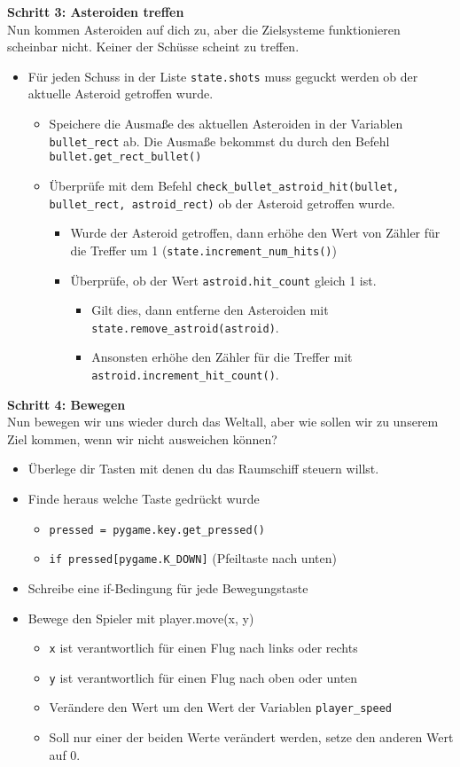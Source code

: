 \textbf{Schritt 3: Asteroiden treffen}\\
Nun kommen Asteroiden auf dich zu, aber die Zielsysteme funktionieren scheinbar nicht. Keiner der Schüsse scheint zu treffen.
\begin{itemize}
	\item Für jeden Schuss in der Liste \texttt{state.shots} muss geguckt werden ob der aktuelle Asteroid getroffen wurde.
	\begin{itemize}
		\item Speichere die Ausmaße des aktuellen Asteroiden in der Variablen \texttt{bullet\_rect} ab. Die Ausmaße bekommst du durch den Befehl \texttt{bullet.get\_rect\_bullet()}
		\item Überprüfe mit dem Befehl \texttt{check\_bullet\_astroid\_hit(bullet, bullet\_rect, astroid\_rect)} ob der Asteroid getroffen wurde.
		\begin{itemize}
			\item Wurde der Asteroid getroffen, dann erhöhe den Wert von Zähler für die Treffer um 1 (\texttt{state.increment\_num\_hits()})
			\item Überprüfe, ob der Wert \texttt{astroid.hit\_count} gleich 1 ist.
			\begin{itemize}
				\item Gilt dies, dann entferne den Asteroiden mit \texttt{state.remove\_astroid(astroid)}.
				\item Ansonsten erhöhe den Zähler für die Treffer mit \texttt{astroid.increment\_hit\_count()}.
			\end{itemize}
		\end{itemize}
	\end{itemize}
\end{itemize}
\textbf{Schritt 4: Bewegen}\\
Nun bewegen wir uns wieder durch das Weltall, aber wie sollen wir zu unserem Ziel kommen, wenn wir nicht ausweichen können?
\begin{itemize}
	\item Überlege dir Tasten mit denen du das Raumschiff steuern willst.
	\item Finde heraus welche Taste gedrückt wurde
	\begin{itemize}
		\item \texttt{pressed = pygame.key.get\_pressed()}
		\item \texttt{if pressed[pygame.K\_DOWN]} (Pfeiltaste nach unten)
	\end{itemize}
	\item Schreibe eine if-Bedingung für jede Bewegungstaste
	\item Bewege den Spieler mit player.move(x, y)
	\begin{itemize}
		\item \texttt{x} ist verantwortlich für einen Flug nach links oder rechts
		\item \texttt{y} ist verantwortlich für einen Flug nach oben oder unten
		\item Verändere den Wert um den Wert der Variablen \texttt{player\_speed}
		\item Soll nur einer der beiden Werte verändert werden, setze den anderen Wert auf 0.
	\end{itemize}	 
\end{itemize}